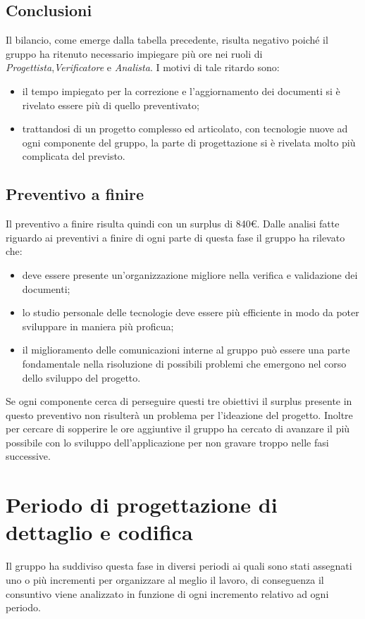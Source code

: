 {{{{{{\subsection{Conclusioni}\label{ConsuntivoPeriodoDiProgettazioneArchitetturaleConclusioni}
Il bilancio, come emerge dalla tabella precedente, risulta negativo poiché il gruppo ha ritenuto necessario impiegare più ore nei ruoli di \textit{Progettista},\textit{Verificatore} e \textit{Analista}. I motivi di tale ritardo sono:
\begin{itemize}
	\item il tempo impiegato per la correzione e l'aggiornamento dei documenti si è rivelato essere più di quello preventivato;
	\item trattandosi di un progetto complesso ed articolato, con tecnologie nuove ad ogni componente del gruppo, la parte di progettazione si è rivelata molto più complicata del previsto.
\end{itemize}

\subsection{Preventivo a finire}\label{ConsuntivoPeriodoDiProgettazioneArchitetturalePreventivoAFinire}
Il preventivo a finire risulta quindi con un surplus di 840\euro. Dalle analisi fatte riguardo ai preventivi a finire di ogni parte di questa fase il gruppo ha rilevato che:
\begin{itemize}
	\item deve essere presente un'organizzazione migliore nella verifica e validazione dei documenti;
	\item lo studio personale delle tecnologie deve essere più efficiente in modo da poter sviluppare in maniera più proficua;
	\item il miglioramento delle comunicazioni interne al gruppo può essere una parte fondamentale nella risoluzione di possibili problemi che emergono nel corso dello sviluppo del progetto.
\end{itemize}
Se ogni componente cerca di perseguire questi tre obiettivi il surplus presente in questo preventivo non risulterà un problema per l'ideazione del progetto. Inoltre per cercare di sopperire le ore aggiuntive il gruppo ha cercato di avanzare il più possibile con lo sviluppo dell'applicazione per non gravare troppo nelle fasi successive.

\section{Periodo di progettazione di dettaglio e codifica}\label{ConsutivoFaseProgettazioneDettaglioCodifica}
Il gruppo ha suddiviso questa fase in diversi periodi ai quali sono stati assegnati uno o più incrementi per organizzare al meglio il lavoro, di conseguenza il consuntivo viene analizzato in funzione di ogni incremento relativo ad ogni periodo.

}}}}}}
